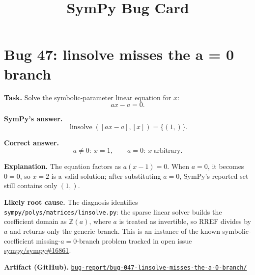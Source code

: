 \documentclass[11pt]{article}
\title{SymPy Bug Card}
\author{}
\date{}
\newcommand{\artifactrepo}{https://github.com/TODO-org/TODO-repo}
\newcommand{\bugbundle}[1]{\href{\artifactrepo/tree/main/bug-report/#1}{\nolinkurl{bug-report/#1/}}}
\begin{document}
\maketitle

\section*{Bug 47: linsolve misses the a = 0 branch}

\begin{counterexamplebox}
\textbf{Task.} Solve the symbolic-parameter linear equation for \(x\):
\[
a x-a=0.
\]

\medskip
\textbf{SymPy's answer.}
\[
\operatorname{linsolve}([a x-a],[x])=\{(1,)\}.
\]

\medskip
\textbf{Correct answer.}
\[
a\ne 0:\ x=1,
\qquad
a=0:\ x\ \text{arbitrary}.
\]

\medskip
\textbf{Explanation.} The equation factors as \(a(x-1)=0\).  When \(a=0\),
it becomes \(0=0\), so \(x=2\) is a valid solution; after substituting
\(a=0\), SymPy's reported set still contains only \((1,)\).

\medskip
\textbf{Likely root cause.} The diagnosis identifies
\nolinkurl{sympy/polys/matrices/linsolve.py}: the sparse linear solver builds
the coefficient domain as \(\mathbb{Z}(a)\), where \(a\) is treated as
invertible, so RREF divides by \(a\) and returns only the generic branch.  This
is an instance of the known symbolic-coefficient missing-\(a=0\)-branch problem
tracked in open issue \href{https://github.com/sympy/sympy/issues/16861}{sympy/sympy\#16861}.

\medskip
\textbf{Artifact (GitHub).} \bugbundle{bug-047-linsolve-misses-the-a-0-branch}
\end{counterexamplebox}
\end{document}
